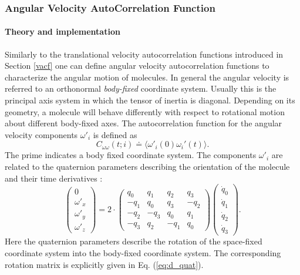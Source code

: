\documentclass[a4paper,11pt]{report}
\begin{document}
\subsubsection{Angular Velocity AutoCorrelation Function}
\label{avacf}
\paragraph{Theory and implementation\\}
\label{avacf_theory}
Similarly to the translational velocity autocorrelation functions introduced in Section \ref{vacf} one can define angular 
velocity autocorrelation functions to characterize the angular motion of molecules. In general the angular velocity is 
referred to an orthonormal {\em body-fixed} coordinate system. Usually this is the principal axis system in which the tensor 
of inertia is diagonal. Depending on its geometry, a molecule will behave differently with respect to rotational motion 
about different body-fixed axes.  The autocorrelation function for the angular velocity components $\omega'_{i}$ is defined 
as
\begin{equation}
\label{eq:c_omgomg}
C_{\omega\omega}(t;i) \doteq
\langle\omega'_{i}(0)\omega_{i}'(t) \rangle.
\end{equation}
The prime indicates a body fixed coordinate system. The components $\omega'_{i}$ are related to the quaternion parameters
describing the orientation of the molecule and their time derivatives \cite{Smith:1992,Tildesley}:
\begin{equation}
\label{eq:omega_prime_quat_dot)}
\left(\begin{array}{c}
      0         \\
      \omega'_x \\
      \omega'_y \\
      \omega'_z 
      \end{array}
\right)      
      = 2 \cdot
\left(
\begin{array}{rrrr}
  q_0 & q_1 & q_2 & q_3 \\
 -q_1 & q_0 & q_3 &-q_2 \\
 -q_2 &-q_3 & q_0 & q_1 \\
 -q_3 & q_2 &-q_1 & q_0 
\end{array}
\right)
\left(\begin{array}{c}
      \dot q_0 \\
      \dot q_1 \\
      \dot q_2 \\
      \dot q_3 
      \end{array}
\right).
\end{equation}
Here the quaternion parameters describe the rotation of the space-fixed coordinate system into the body-fixed coordinate 
system. The corresponding rotation matrix is explicitly given in Eq. (\ref{eq:d_quat}).
\end{document}
